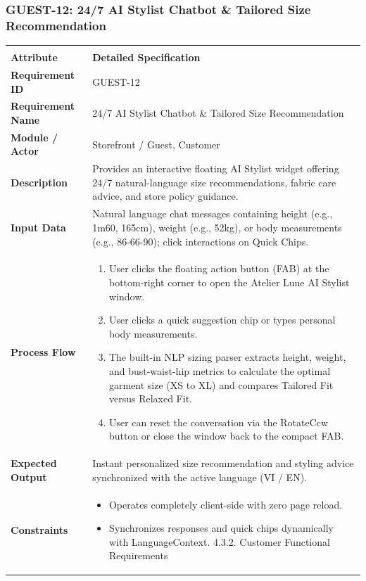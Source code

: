 \documentclass[12pt,a4paper,oneside]{report}
\begin{document}
\subsubsection{GUEST-12: 24/7 AI Stylist Chatbot \& Tailored Size Recommendation}
\begin{longtable}{|p{3.6cm}|p{11.9cm}|}
\hline
\rowcolor{PrimaryBrown}
\multicolumn{2}{|p{15.5cm}|}{\textbf{\textcolor{white}{Functional Specification: GUEST-12 -- 24/7 AI Stylist Chatbot \& Tailored Size Recommendation}}} \\
\hline
\endfirsthead
\hline
\rowcolor{PrimaryBrown}
\multicolumn{2}{|p{15.5cm}|}{\textbf{\textcolor{white}{Functional Specification: GUEST-12 (Continued)}}} \\
\hline
\textbf{Attribute} & \textbf{Detailed Specification} \\
\hline
\endhead
\hline
\endfoot
\textbf{Requirement ID} & GUEST-12 \\
\hline
\textbf{Requirement Name} & 24/7 AI Stylist Chatbot \& Tailored Size Recommendation \\
\hline
\textbf{Module / Actor} & Storefront / Guest, Customer \\
\hline
\textbf{Description} & Provides an interactive floating AI Stylist widget offering 24/7 natural-language size recommendations, fabric care advice, and store policy guidance. \\
\hline
\textbf{Input Data} & Natural language chat messages containing height (e.g., 1m60, 165cm), weight (e.g., 52kg), or body measurements (e.g., 86-66-90); click interactions on Quick Chips. \\
\hline
\textbf{Process Flow} & \begin{enumerate}[leftmargin=*,nosep,topsep=2pt]
  \item User clicks the floating action button (FAB) at the bottom-right corner to open the Atelier Lune AI Stylist window.
  \item User clicks a quick suggestion chip or types personal body measurements.
  \item The built-in NLP sizing parser extracts height, weight, and bust-waist-hip metrics to calculate the optimal garment size (XS to XL) and compares Tailored Fit versus Relaxed Fit.
  \item User can reset the conversation via the RotateCcw button or close the window back to the compact FAB.
\end{enumerate} \\
\hline
\textbf{Expected Output} & Instant personalized size recommendation and styling advice synchronized with the active language (VI / EN). \\
\hline
\textbf{Constraints} & \begin{itemize}[leftmargin=*,nosep,topsep=2pt]
  \item Operates completely client-side with zero page reload.
  \item Synchronizes responses and quick chips dynamically with LanguageContext. 4.3.2. Customer Functional Requirements
\end{itemize} \\
\hline
\end{longtable}
\end{document}
